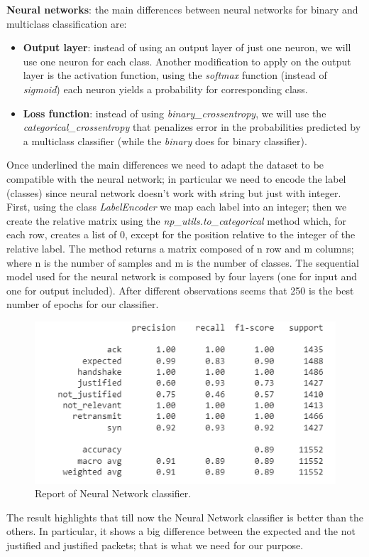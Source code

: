 \documentclass[sigconf]{acmart}
\begin{document}
    \textbf{Neural networks}: the main differences between neural networks for binary and multiclass classification are:
    \begin{itemize}
        \item \textbf{Output layer}: instead of using an output layer of just one neuron, we will use one neuron for each class. Another modification to apply on the output layer is the activation function, using the \textit{softmax} function (instead of \textit{sigmoid}) each neuron yields a probability for corresponding class.
        \item \textbf{Loss function}: instead of using \textit{binary\_crossentropy}, we will use the \textit{categorical\_crossentropy} that penalizes error in the probabilities predicted by a multiclass classifier (while the \textit{binary} does for binary classifier).
    \end{itemize}
    Once underlined the main differences we need to adapt the dataset to be compatible with the neural network; in particular we need to encode the label (classes) since neural network doesn't work with string but just with integer. First, using the class \textit{LabelEncoder} we map each label into an integer; then we create the relative matrix using the \textit{np\_utils.to\_categorical} method which, for each row, creates a list of 0, except for the position relative to the integer of the relative label. The method returns a matrix composed of n row and m columns; where n is the number of samples and m is the number of classes.
    The sequential model used for the neural network is composed by four layers (one for input and one for output included). After different observations seems that 250 is the best number of epochs for our classifier.
    \begin{figure}[h!]
        \includegraphics[width=\linewidth]{img/nn_classifier.png}
        \caption{Report of Neural Network classifier.}
        \label{fig:nn_classifier}
    \end{figure}
    The result highlights that till now the Neural Network classifier is better than the others. In particular, it shows a big difference between the expected and the not justified and justified packets; that is what we need for our purpose.
\end{document}
